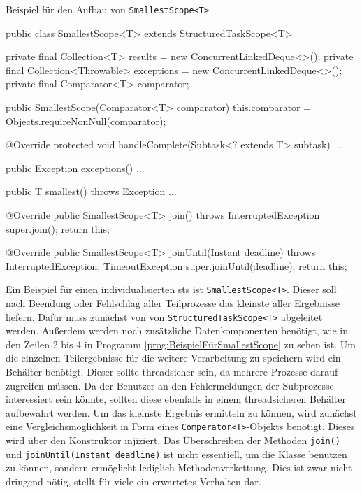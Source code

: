     \begin{program} [H]
        \caption{Beispiel für den Aufbau von \texttt{SmallestScope<T>}}
        \label{prog:BeispielFürSmallestScope}
    \begin{JavaCode}[language=Java, numbers=left]
public class SmallestScope<T> extends StructuredTaskScope<T> {
    private final Collection<T> results = new ConcurrentLinkedDeque<>();
    private final Collection<Throwable> exceptions = new ConcurrentLinkedDeque<>();
    private final Comparator<T> comparator;

    public SmallestScope(Comparator<T> comparator) {
        this.comparator = Objects.requireNonNull(comparator);
    }

    @Override
    protected void handleComplete(Subtask<? extends T> subtask) {...}

    public Exception exceptions() {...}

    public T smallest() throws Exception {...}

    @Override
    public SmallestScope<T> join() throws InterruptedException {
        super.join();
        return this;
    }

    @Override
    public SmallestScope<T> joinUntil(Instant deadline)
        throws InterruptedException, TimeoutException{
            super.joinUntil(deadline);
            return this;
    } 
}\end{JavaCode}
    \end{program}
    
    Ein Beispiel für einen individualisierten \gls{sts} ist \texttt{SmallestScope<T>}. Dieser soll nach Beendung oder Fehlschlag aller Teilprozesse das kleinste 
    aller Ergebnisse liefern.
    Dafür muss zunächst von von \texttt{StructuredTaskScope<T>} abgeleitet werden. Außerdem werden noch zusätzliche Datenkomponenten benötigt, wie in den Zeilen 2 bis 4 in Programm
    \ref{prog:BeispielFürSmallestScope} zu sehen ist. 
    Um die einzelnen Teilergebnisse für die weitere Verarbeitung zu speichern wird ein Behälter benötigt.
    Dieser sollte threadsicher sein, da mehrere Prozesse darauf zugreifen müssen.
    Da der Benutzer an den Fehlermeldungen der Subprozesse interessiert sein könnte, sollten diese ebenfalls in einem threadsicheren Behälter aufbewahrt werden. 
    Um das kleinste Ergebnis ermitteln zu können, wird zunächst eine Vergleichsmöglichkeit in Form eines \texttt{Comperator<T>}-Objekts benötigt. Dieses wird über den
    Konstruktor injiziert.
    Das Überschreiben der Methoden \texttt{join()} und \texttt{joinUntil(Instant deadline)} ist nicht essentiell, um die Klasse benutzen zu können, sondern ermöglicht
    lediglich Methodenverkettung. Dies ist zwar nicht dringend nötig, stellt für viele ein erwartetes Verhalten dar.

